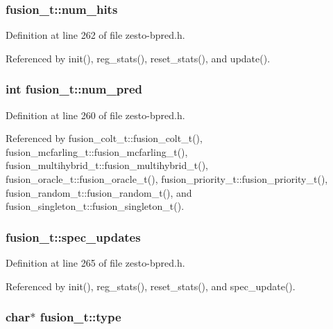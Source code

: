 \subsubsection[{num\_\-hits}]{ {\bf fusion\_\-t::num\_\-hits}\hspace{0.3cm}{\tt  [protected]}}\label{classfusion__t_f1f594aa25cd5c1226431ad412549ca5}




Definition at line 262 of file zesto-bpred.h.

Referenced by init(), reg\_\-stats(), reset\_\-stats(), and update().
\subsubsection[{num\_\-pred}]{\setlength{\rightskip}{0pt plus 5cm}int {\bf fusion\_\-t::num\_\-pred}\hspace{0.3cm}{\tt  [protected]}}\label{classfusion__t_ce0fc3061288ad024a3fd3295ada0ae9}




Definition at line 260 of file zesto-bpred.h.

Referenced by fusion\_\-colt\_\-t::fusion\_\-colt\_\-t(), fusion\_\-mcfarling\_\-t::fusion\_\-mcfarling\_\-t(), fusion\_\-multihybrid\_\-t::fusion\_\-multihybrid\_\-t(), fusion\_\-oracle\_\-t::fusion\_\-oracle\_\-t(), fusion\_\-priority\_\-t::fusion\_\-priority\_\-t(), fusion\_\-random\_\-t::fusion\_\-random\_\-t(), and fusion\_\-singleton\_\-t::fusion\_\-singleton\_\-t().
\subsubsection[{spec\_\-updates}]{ {\bf fusion\_\-t::spec\_\-updates}\hspace{0.3cm}{\tt  [protected]}}\label{classfusion__t_00685b4010d24234f2cb730c66d6e5a6}




Definition at line 265 of file zesto-bpred.h.

Referenced by init(), reg\_\-stats(), reset\_\-stats(), and spec\_\-update().
\subsubsection[{type}]{\setlength{\rightskip}{0pt plus 5cm}char$\ast$ {\bf fusion\_\-t::type}\hspace{0.3cm}{\tt  [protected]}}\label{classfusion__t_7cccd266cdca11cad51fa7bd848391c6}




